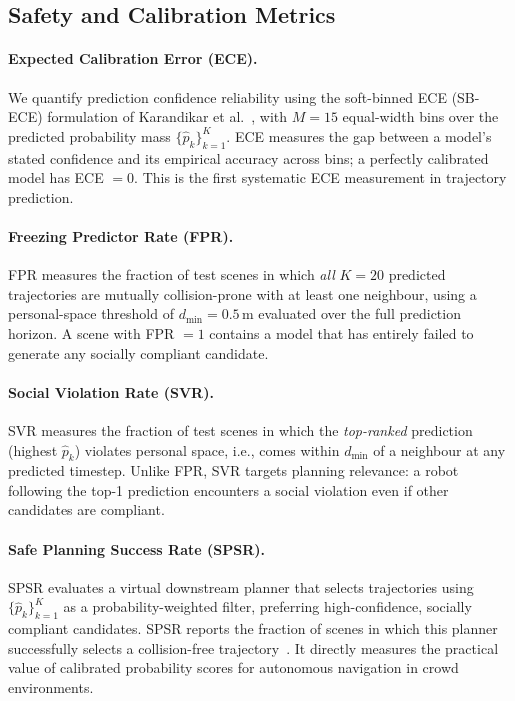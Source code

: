 \documentclass{article}
\begin{document}
\subsection{Safety and Calibration Metrics}
\label{sec:prelim:metrics}

\paragraph{Expected Calibration Error (ECE).}
We quantify prediction confidence reliability using the soft-binned
ECE (SB-ECE) formulation of Karandikar et al.~\cite{karandikar2021soft},
with \(M=15\) equal-width bins over the predicted probability
mass \(\{\hat{p}_k\}_{k=1}^{K}\).
ECE measures the gap between a model's stated confidence and its
empirical accuracy across bins; a perfectly calibrated model has
ECE \(= 0\).
This is the first systematic ECE measurement in trajectory prediction.

\paragraph{Freezing Predictor Rate (FPR).}
FPR measures the fraction of test scenes in which \emph{all}
\(K=20\) predicted trajectories are mutually collision-prone with
at least one neighbour, using a personal-space threshold of
\(d_\text{min} = 0.5\,\text{m}\) evaluated over the full prediction
horizon.
A scene with FPR \(= 1\) contains a model that has entirely
failed to generate any socially compliant candidate.

\paragraph{Social Violation Rate (SVR).}
SVR measures the fraction of test scenes in which the
\emph{top-ranked} prediction (highest \(\hat{p}_k\)) violates
personal space, i.e., comes within \(d_\text{min}\) of a neighbour
at any predicted timestep.
Unlike FPR, SVR targets planning relevance: a robot following the
top-1 prediction encounters a social violation even if
other candidates are compliant.

\paragraph{Safe Planning Success Rate (SPSR).}
SPSR evaluates a virtual downstream planner that selects trajectories
using \(\{\hat{p}_k\}_{k=1}^{K}\) as a probability-weighted filter,
preferring high-confidence, socially compliant candidates.
SPSR reports the fraction of scenes in which this planner successfully
selects a collision-free trajectory~\cite{xu2022socialvae}.
It directly measures the practical value of calibrated probability
scores for autonomous navigation in crowd environments.
\end{document}
